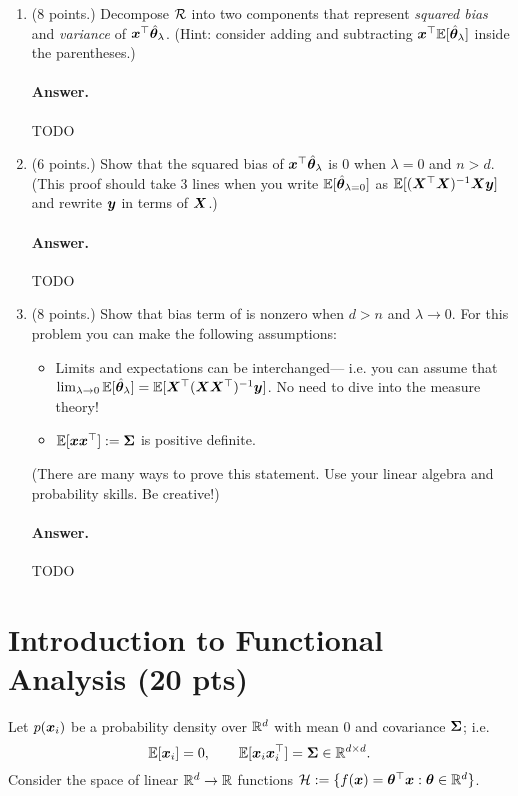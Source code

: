 \documentclass[11pt,letterpaper]{article}
\newenvironment{answer}{%
    \vspace{1em}
    \color{black}
    \paragraph{Answer.}
  }{%
    \vspace{1em}
  }
\begin{document}
\begin{enumerate}
  \item (8 points.) Decompose $\mathcal{R}$ into two components that represent \emph{squared bias} and \emph{variance} of ${\bm{x}}^\top \hat{{\bm{\theta}}}_\lambda$.
    (Hint: consider adding and subtracting ${\bm{x}}^\top \mathbb{E}[\hat{{\bm{\theta}}}_\lambda]$ inside the parentheses.)

\begin{answer}
  TODO
\end{answer}

  \item (6 points.) Show that the squared bias of ${\bm{x}}^\top \hat{{\bm{\theta}}}_\lambda$ is 0 when $\lambda = 0$ and $n > d$.
    (This proof should take 3 lines when you write $\mathbb{E}[\hat{{\bm{\theta}}}_{\lambda=0}]$ as $\mathbb{E}[({\bm{X}}^\top{\bm{X}})^{-1}{\bm{X}}{\bm{y}}]$ and rewrite ${\bm{y}}$ in terms of ${\bm{X}}$.)

\begin{answer}
  TODO
\end{answer}

  \item (8 points.) Show that bias term of is nonzero when $d > n$ and $\lambda \to 0$.
    For this problem you can make the following assumptions:
    \begin{itemize}
      \item Limits and expectations can be interchanged---
        i.e. you can assume that $\lim_{\lambda \to 0} \mathbb{E}[\hat{{\bm{\theta}}}_\lambda] = \mathbb{E}[ {\bm{X}}^\top ({\bm{X}} {\bm{X}}^\top)^{-1} {\bm{y}}]$.
        No need to dive into the measure theory!
      \item $\mathbb{E}[{\bm{x}} {\bm{x}}^\top] := {\bm{\Sigma}}$ is positive definite.
    \end{itemize}

    (There are many ways to prove this statement. Use your linear algebra and probability skills. Be creative!)


\begin{answer}
  TODO
\end{answer}

\end{enumerate}





\section{Introduction to Functional Analysis (20 pts)}

Let $p({\bm{x}}_i)$ be a probability density over $\mathbb{R}^d$ with mean 0 and covariance ${\bm{\Sigma}}$; i.e.
%
$$\mathbb{E}[{\bm{x}}_i] = 0, \qquad \mathbb{E}[{\bm{x}}_i {\bm{x}}_i^\top] = {\bm{\Sigma}} \in \mathbb{R}^{d \times d}. $$
%
Consider the space of linear $\mathbb{R}^d \to \mathbb{R}$ functions $\mathcal{H} := \{ f({\bm{x}}) = {\bm{\theta}}^\top {\bm{x}} : {\bm{\theta}} \in \mathbb{R}^d \}$.
\end{document}

